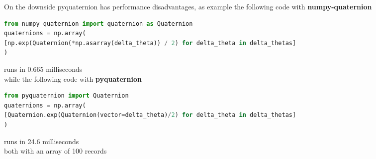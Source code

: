 On the downside pyquaternion has performance disadvantages, as example the following code with \textbf{numpy-quaternion}
\begin{changemargin}{-1cm}{-1cm}
\begin{lstlisting}[language=Python,frame=single]
from numpy_quaternion import quaternion as Quaternion
quaternions = np.array(
[np.exp(Quaternion(*np.asarray(delta_theta)) / 2) for delta_theta in delta_thetas]
)
\end{lstlisting}
\end{changemargin}
runs in 0.665 milliseconds \\
while the following code with \textbf{pyquaternion} 
\begin{changemargin}{-1cm}{-1cm}
\begin{lstlisting}[language=Python,frame=single]
from pyquaternion import Quaternion
quaternions = np.array(
[Quaternion.exp(Quaternion(vector=delta_theta)/2) for delta_theta in delta_thetas]
)
\end{lstlisting}
\end{changemargin}
runs in 24.6 milliseconds \\
both with an array of 100 records